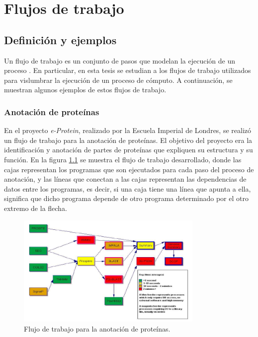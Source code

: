 \chapter{Flujos de trabajo}
\label{chap:workflows}

\section{Definición y ejemplos}
Un flujo de trabajo es un conjunto de pasos que modelan la ejecución de un proceso \cite{gutierrez2012agent}.
En particular, en esta tesis se estudian a los flujos de trabajo utilizados para vislumbrar la ejecución de un proceso de cómputo. A continuación, se muestran algunos ejemplos de estos flujos de trabajo.

\subsection{Anotación de proteínas}
En el proyecto \emph{e-Protein}, realizado por la Escuela Imperial de Londres, se realizó un flujo de trabajo para la anotación de proteínas. El objetivo del proyecto \cite{o2004mapping} era la identificación y anotación de partes de proteínas que expliquen su estructura y su función. En la figura \ref{fig:iceni-workflow} se muestra el flujo de trabajo desarrollado, donde las cajas representan los programas que son ejecutados para cada paso del proceso de anotación, y las líneas que conectan a las cajas representan las dependencias de datos entre los programas, es decir, si una caja tiene una línea que apunta a ella, significa que dicho programa depende de otro programa determinado por el otro extremo de la flecha.

\begin{figure}
\begin{center}
\includegraphics[width=0.8\textwidth]{imagenes/iceni-workflow}
\end{center}
\caption{Flujo de trabajo para la anotación de proteínas.}
\label{fig:iceni-workflow}
\end{figure}


